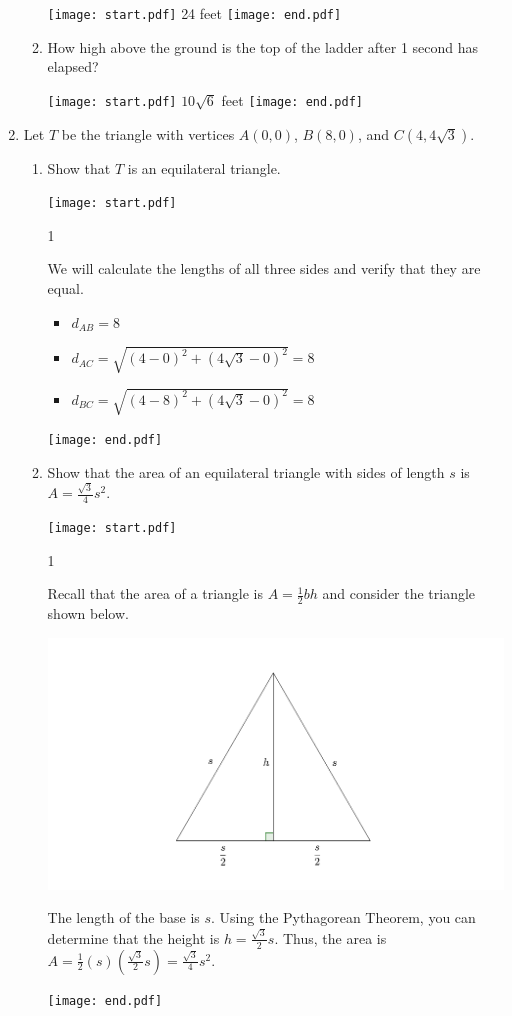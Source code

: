 \documentclass[12pt]{article}
\begin{document}
\begin{enumerate}
\begin{enumerate}
\texttt{[image: start.pdf]}
{24 feet}
\texttt{[image: end.pdf]}


\item How high above the ground is the top of the ladder after 1 second has elapsed?

\texttt{[image: start.pdf]}
{$10\sqrt{6}$ feet}
\texttt{[image: end.pdf]}


\end{enumerate}

\item Let $T$ be the triangle with vertices $A(0,0)$, $B(8,0)$, and $C(4,4\sqrt{3})$.

\begin{enumerate}

\item Show that $T$ is an equilateral triangle.

\texttt{[image: start.pdf]}
{{1\linewidth}{We will calculate the lengths of all three sides and verify that they are equal.
\begin{itemize}
\item $d_{AB}=8$
\item $d_{AC}=\sqrt{(4-0)^2+(4\sqrt{3}-0)^2}=8$
\item $d_{BC}=\sqrt{(4-8)^2+(4\sqrt{3}-0)^2}=8$
\end{itemize}}}
\texttt{[image: end.pdf]}


\item Show that the area of an equilateral triangle with sides of length $s$ is $A=\frac{\sqrt{3}}{4}s^2$.

\texttt{[image: start.pdf]}
{{1\linewidth}{Recall that the area of a triangle is $A=\frac{1}{2}bh$ and consider the triangle shown below.
\begin{center}
\includegraphics[scale=0.5]{equilateral.pdf}
\end{center}
The length of the base is $s$.  Using the Pythagorean Theorem, you can determine that the height is $h=\frac{\sqrt{3}}{2}s$.  Thus, the area is $A=\frac{1}{2}(s)\left(\frac{\sqrt{3}}{2}s\right)=\frac{\sqrt{3}}{4}s^2$.}}
\texttt{[image: end.pdf]}



\end{enumerate}
\end{enumerate}
\end{document}
